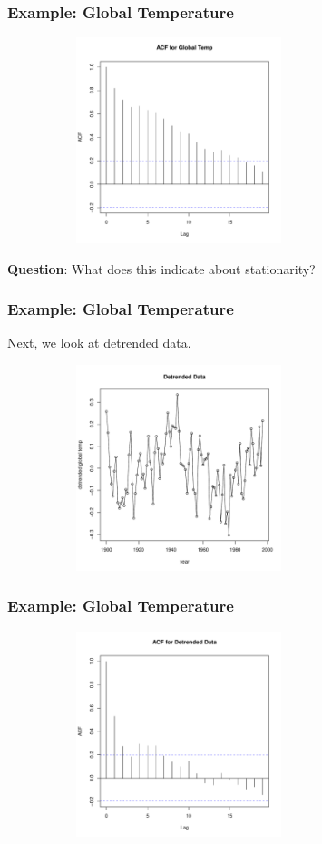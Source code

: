 \documentclass[%
xcolor=pdftex]{beamer}
\begin{document}
\begin{frame}
\frametitle{Example: Global Temperature}

\includegraphics[width=100mm, height=60mm]{pics/acf1.pdf}

\textbf{Question}: What does this indicate about stationarity?

\end{frame}

\begin{frame}
\frametitle{Example: Global Temperature}

Next, we look at detrended data.

\includegraphics[width=100mm, height=60mm]{pics/plots2.pdf}

\end{frame}

\begin{frame}
\frametitle{Example: Global Temperature}

\includegraphics[width=100mm, height=60mm]{pics/acf2.pdf}

\end{frame}
\end{document}
